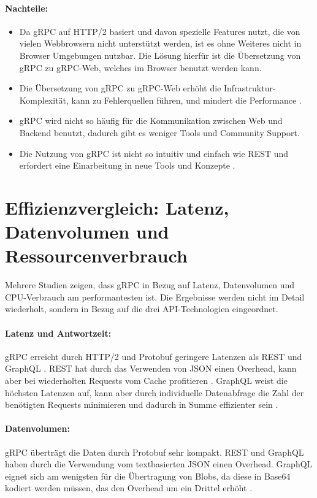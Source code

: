 \paragraph{Nachteile:}
\begin{itemize}
	\item Da gRPC auf HTTP/2 basiert und davon spezielle Features nutzt, die von vielen Webbrowsern nicht unterstützt werden, ist es ohne Weiteres nicht in Browser Umgebungen nutzbar. Die Lösung hierfür ist die Übersetzung von gRPC zu gRPC-Web, welches im Browser benutzt werden kann.
	\item Die Übersetzung von gRPC zu gRPC-Web erhöht die Infrastruktur-Komplexität, kann zu Fehlerquellen führen, und mindert die Performance \parencite{grpc-web-docs}.
	\item gRPC wird nicht so häufig für die Kommunikation zwischen Web und Backend benutzt, dadurch gibt es weniger Tools und Community Support.
	\item Die Nutzung von gRPC ist nicht so intuitiv und einfach wie REST und erfordert eine Einarbeitung in neue Tools und Konzepte \parencite{redhat-apiguide}.
\end{itemize}

\section{Effizienzvergleich: Latenz, Datenvolumen und Ressourcenverbrauch}
Mehrere Studien zeigen, dass gRPC in Bezug auf Latenz, Datenvolumen und CPU-Verbrauch am performantesten ist. Die Ergebnisse werden nicht im Detail wiederholt, sondern in Bezug auf die drei API-Technologien eingeordnet.

\paragraph{Latenz und Antwortzeit:} gRPC erreicht durch HTTP/2 und Protobuf geringere Latenzen als REST und GraphQL \parencite{Niswar2024PerformanceEvaluation,BergRedi2023Benchmarking}. REST hat durch das Verwenden von JSON einen Overhead, kann aber bei wiederholten Requests vom Cache profitieren \parencite{redhat-apiguide}. GraphQL weist die höchsten Latenzen auf, kann aber durch individuelle Datenabfrage die Zahl der benötigten Requests minimieren und dadurch in Summe effizienter sein \parencite{amazon2025graphql}.


\paragraph{Datenvolumen:}  
gRPC überträgt die Daten durch Protobuf sehr kompakt. REST und GraphQL haben durch die Verwendung vom textbasierten JSON einen Overhead. GraphQL eignet sich am wenigsten für die Übertragung von Blobs, da diese in Base64 kodiert werden müssen, das den Overhead um ein Drittel erhöht \parencite{BergRedi2023Benchmarking,redhat-apiguide,amazon2025graphql}.


